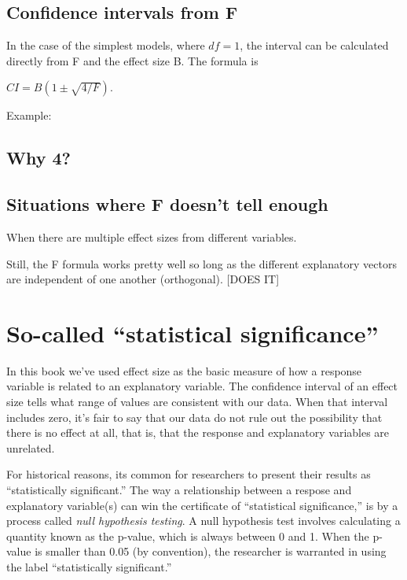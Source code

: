 \documentclass[]{book}
\begin{document}
\hypertarget{confidence-intervals-from-f}{%
\section{Confidence intervals from F}\label{confidence-intervals-from-f}}

In the case of the simplest models, where \(df = 1\), the interval can be calculated directly from F and the effect size B. The formula is

\(CI = B (1 \pm \sqrt{4/F}).\)

Example:

\hypertarget{why-4}{%
\section{Why 4?}\label{why-4}}

\hypertarget{situations-where-f-doesnt-tell-enough}{%
\section{Situations where F doesn't tell enough}\label{situations-where-f-doesnt-tell-enough}}

When there are multiple effect sizes from different variables.

Still, the F formula works pretty well so long as the different explanatory vectors are independent of one another (orthogonal). {[}DOES IT{]}

\hypertarget{so-called-statistical-significance}{%
\chapter{So-called ``statistical significance''}\label{so-called-statistical-significance}}

In this book we've used effect size as the basic measure of how a response variable is related to an explanatory variable. The confidence interval of an effect size tells what range of values are consistent with our data. When that interval includes zero, it's fair to say that our data do not rule out the possibility that there is no effect at all, that is, that the response and explanatory variables are unrelated.

For historical reasons, its common for researchers to present their results as ``statistically significant.'' The way a relationship between a respose and explanatory variable(s) can win the certificate of ``statistical significance,'' is by a process called \emph{null hypothesis testing}. A null hypothesis test involves calculating a quantity known as the p-value, which is always between 0 and 1. When the p-value is smaller than 0.05 (by convention), the researcher is warranted in using the label ``statistically significant.''
\end{document}
